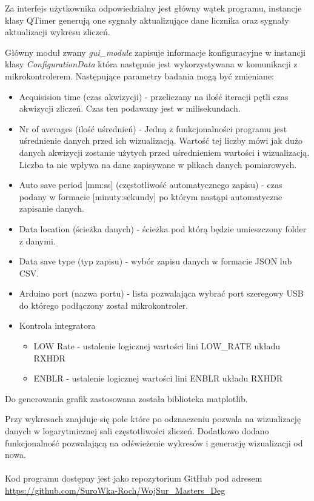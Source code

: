 Za interfejs użytkownika odpowiedzialny jest główny wątek programu, instancje klasy QTimer\cite{doc pyqt} generują one sygnały aktualizujące dane licznika oraz sygnały aktualizacji wykresu zliczeń. 

Główny moduł zwany \textit{gui\_module} zapisuje informacje konfiguracyjne w instancji klasy \textit{ConfigurationData} która następnie jest wykorzystywana w komunikacji z mikrokontrolerem. Następujące parametry badania mogą być zmieniane:
\begin{itemize}
        \item Acquisision time (czas akwizycji) - przeliczany na ilość iteracji pętli czas akwizycji zliczeń. Czas ten podawany jest w milisekundach.
        \item Nr of averages (ilość uśrednień) - Jedną z funkcjonalności programu jest uśrednienie danych przed ich wizualizacją. Wartość tej liczby mówi jak dużo danych akwizycji zostanie użytych przed uśrednieniem wartości i wizualizacją. Liczba ta nie wpływa na dane zapisywane w plikach danych pomiarowych.
        \item Auto save period [mm:ss] (częstotliwość automatycznego zapisu) - czas podany w formacie [minuty:sekundy] po którym nastąpi automatyczne zapisanie danych. 
        \item Data location (ścieżka danych) - ścieżka pod którą będzie umieszczony folder z danymi. 
        \item Data save type (typ zapisu) - wybór zapisu danych w formacie JSON lub CSV.
        \item Arduino port (nazwa portu) - lista pozwalająca wybrać port szeregowy USB do którego podłączony został mikrokontroler. 
        \item Kontrola integratora 
        \begin{itemize}
                \item LOW Rate - ustalenie logicznej wartości lini LOW\_RATE układu RXHDR
                \item ENBLR - ustalenie logicznej wartości lini ENBLR układu RXHDR
        \end{itemize} 
\end{itemize}

Do generowania grafik zastosowana została biblioteka matplotlib\cite{doc matplotlib}. 

Przy wykresach znajduje się pole które po odznaczeniu pozwala na wizualizację danych w logarytmicznej sali częstotliwości zliczeń. Dodatkowo dodano funkcjonalność pozwalającą na odświeżenie wykresów i generację wizualizacji od nowa.

\paragraph*{}

Kod programu dostępny jest jako repozytorium GitHub pod adresem \url{https://github.com/SuroWka-Roch/WojSur_Masters_Deg}
